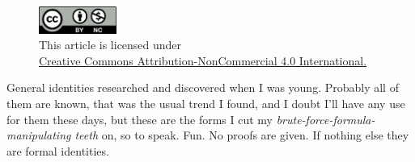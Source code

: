 \documentclass[twoside]{article}
\begin{document}
\begin{figure}[h]
\centering
\includegraphics[width=1in]{../../../cc-by-nc.png}\\[0.1in]
\tiny This article is licensed under \\
\href{http://creativecommons.org/licenses/by-nc/4.0/}
{Creative Commons Attribution-NonCommercial 4.0 International.}\\[0.3in]
\end{figure}

General identities researched and discovered when I was young. Probably all of them are known,
that was the usual trend I found, and I doubt I'll have any use for them these days,
but these are the forms I cut my \emph{brute-force-formula-manipulating teeth} on, so to speak.
Fun.  No proofs are given. If nothing else they are formal identities.
\end{document}
